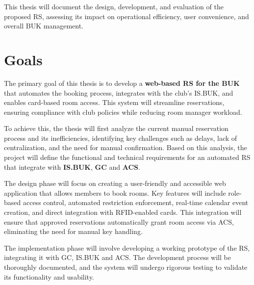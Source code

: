 This thesis will document the design, development, and evaluation of the proposed RS, assessing its impact on operational efficiency, user convenience, and overall BUK management.


\chapter{Goals}

The primary goal of this thesis is to develop a \textbf{web-based RS for the BUK} that automates the booking process, integrates with the club’s IS.BUK, and enables card-based room access. This system will streamline reservations, ensuring compliance with club policies while reducing room manager workload.

To achieve this, the thesis will first analyze the current manual reservation process and its inefficiencies, identifying key challenges such as delays, lack of centralization, and the need for manual confirmation. Based on this analysis, the project will define the functional and technical requirements for an automated RS that integrate with \textbf{IS.BUK}, \textbf{GC} and \textbf{ACS}.

The design phase will focus on creating a user-friendly and accessible web application that allows members to book rooms. Key features will include role-based access control, automated restriction enforcement, real-time calendar event creation, and direct integration with RFID-enabled cards. This integration will ensure that approved reservations automatically grant room access via ACS, eliminating the need for manual key handling.

The implementation phase will involve developing a working prototype of the RS, integrating it with GC, IS.BUK and ACS. The development process will be thoroughly documented, and the system will undergo rigorous testing to validate its functionality and usability.

